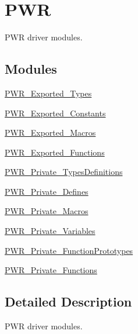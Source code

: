 \hypertarget{group___p_w_r}{}\section{P\+WR}
\label{group___p_w_r}


P\+WR driver modules.  


\subsection*{Modules}
\begin{DoxyCompactItemize}
\item 
\mbox{\hyperlink{group___p_w_r___exported___types}{P\+W\+R\+\_\+\+Exported\+\_\+\+Types}}
\item 
\mbox{\hyperlink{group___p_w_r___exported___constants}{P\+W\+R\+\_\+\+Exported\+\_\+\+Constants}}
\item 
\mbox{\hyperlink{group___p_w_r___exported___macros}{P\+W\+R\+\_\+\+Exported\+\_\+\+Macros}}
\item 
\mbox{\hyperlink{group___p_w_r___exported___functions}{P\+W\+R\+\_\+\+Exported\+\_\+\+Functions}}
\item 
\mbox{\hyperlink{group___p_w_r___private___types_definitions}{P\+W\+R\+\_\+\+Private\+\_\+\+Types\+Definitions}}
\item 
\mbox{\hyperlink{group___p_w_r___private___defines}{P\+W\+R\+\_\+\+Private\+\_\+\+Defines}}
\item 
\mbox{\hyperlink{group___p_w_r___private___macros}{P\+W\+R\+\_\+\+Private\+\_\+\+Macros}}
\item 
\mbox{\hyperlink{group___p_w_r___private___variables}{P\+W\+R\+\_\+\+Private\+\_\+\+Variables}}
\item 
\mbox{\hyperlink{group___p_w_r___private___function_prototypes}{P\+W\+R\+\_\+\+Private\+\_\+\+Function\+Prototypes}}
\item 
\mbox{\hyperlink{group___p_w_r___private___functions}{P\+W\+R\+\_\+\+Private\+\_\+\+Functions}}
\end{DoxyCompactItemize}


\subsection{Detailed Description}
P\+WR driver modules. 

